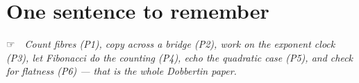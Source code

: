 \documentclass[11pt]{article}
\newcommand{\ic}[1]{{\dingfont #1}}
\newcommand{\hand}{\ic{☞}}
\begin{document}
\section*{One sentence to remember}

\begin{center}\large
\hand\ \ \emph{Count fibres (P1), copy across a bridge (P2), work on the exponent
clock (P3), let Fibonacci do the counting (P4), echo the quadratic case (P5),
and check for flatness (P6) --- that is the whole Dobbertin paper.}
\end{center}
\end{document}
